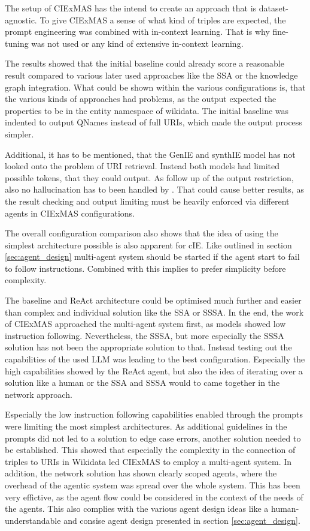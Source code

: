 \documentclass[a4paper,oneside,bibliography=totoc]{scrbook}
\begin{document}
The setup of CIExMAS has the intend to create an approach that is dataset-agnostic. To give CIExMAS a sense of what kind of triples are expected, the prompt engineering was combined with in-context learning. That is why fine-tuning was not used or any kind of extensive in-context learning.

The results showed that the initial baseline could already score a reasonable result compared to various later used approaches like the \ac{SSA} or the knowledge graph integration. What could be shown within the various configurations is, that the various kinds of approaches had problems, as the output expected the properties to be in the entity namespace of wikidata. The initial baseline was indented to output QNames instead of full URIs, which made the output process simpler.

Additional, it has to be mentioned, that the GenIE and synthIE model has not looked onto the problem of URI retrieval. Instead both models had limited possible tokens, that they could output. As follow up of the output restriction, also no hallucination has to been handled by \citet{Josifoski2023}. That could cause better results, as the result checking and output limiting must be heavily enforced via different agents in CIExMAS configurations.

The overall configuration comparison also shows that the idea of using the simplest architecture possible is also apparent for \ac{cIE}. Like outlined in section \ref{sec:agent_design} multi-agent system should be started if the agent start to fail to follow instructions. Combined with \citet{Anthropic2024} this implies to prefer simplicity before complexity.

The baseline and ReAct architecture could be optimised much further and easier than complex and individual solution like the \ac{SSA} or \ac{SSSA}. In the end, the work of CIExMAS approached the multi-agent system first, as models showed low instruction following. Nevertheless, the \ac{SSSA}, but more especially the \ac{SSSA} solution has not been the appropriate solution to that. Instead testing out the capabilities of the used \ac{LLM} was leading to the best configuration. Especially the high capabilities showed by the ReAct agent, but also the idea of iterating over a solution like a human or the \ac{SSA} and \ac{SSSA} would to came together in the network approach.

Especially the low instruction following capabilities enabled through the prompts were limiting the most simplest architectures. As additional guidelines in the prompts did not led to a solution to edge case errors, another solution needed to be established. This showed that especially the complexity in the connection of triples to URIs in Wikidata led CIExMAS to employ a multi-agent system. In addition, the network solution has shown clearly scoped agents, where the overhead of the agentic system was spread over the whole system. This has been very effictive, as the agent flow could be considered in the context of the needs of the agents. This also complies with the various agent design ideas like a human-understandable and consise agent design presented in section \ref{sec:agent_design}.
\end{document}
